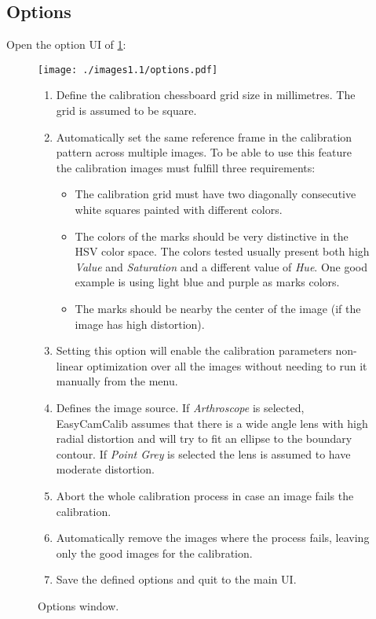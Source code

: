 \documentclass[article,11pt]{memoir}
\begin{document}
\subsection{Options}
Open the option UI of \figurename \ref{fig:options}:
\begin{figure}
\centering
 \texttt{[image: ./images1.1/options.pdf]}
 \caption{Options window.}
\begin{multicols}{2}
\begin{scriptsize}
\begin{enumerate}
 \item Define the calibration chessboard grid size in millimetres. The grid is assumed to be square.
 \item Automatically set the same reference frame in the calibration pattern across multiple images. To be able to use this feature the calibration images must fulfill three requirements:
\begin{itemize}
 \item The calibration grid must have two diagonally consecutive white squares painted with different colors.
 \item The colors of the marks should be very distinctive in the HSV color space. The colors tested usually present both high \textit{Value} and \textit{Saturation} and a different value of \textit{Hue}. One good example is using light blue and purple as marks colors.
 \item The marks should be nearby the center of the image (if the image has high distortion).
\end{itemize}
 \item Setting this option will enable the calibration parameters non-linear optimization over all the images without needing to run it manually from the menu.  
 \item Defines the image source. If \textit{Arthroscope} is selected, EasyCamCalib assumes that there is a wide angle lens with high radial distortion and will try to fit an ellipse to the boundary contour. If \textit{Point Grey} is selected the lens is assumed to have moderate distortion.
 \item Abort the whole calibration process in case an image fails the calibration.
 \item Automatically remove the images where the process fails, leaving only the good images for the calibration.
 \item Save the defined options and quit to the main UI.
\end{enumerate}
\end{scriptsize}
\end{multicols}  
\label{fig:options}
\end{figure}
\end{document}
